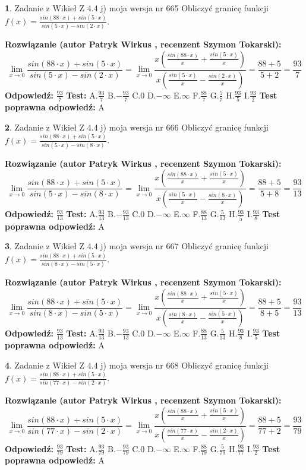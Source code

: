 \documentclass[12pt, a4paper]{article}
\theoremstyle{definition} %
\newtheorem{zad}{}
\newcommand{\zadStart}[1]{\begin{zad}#1\newline}
\newcommand{\zadStop}{\end{zad}}
\newcommand{\rozwStart}[2]{\noindent \textbf{Rozwiązanie (autor #1 , recenzent #2): }\newline}
\newcommand{\rozwStop}{\newline}
\newcommand{\odpStart}{\noindent \textbf{Odpowiedź:}\newline}
\newcommand{\odpStop}{\newline}
\newcommand{\testStart}{\noindent \textbf{Test:}\newline}
\newcommand{\testStop}{\newline}
\newcommand{\kluczStart}{\noindent \textbf{Test poprawna odpowiedź:}\newline}
\newcommand{\kluczStop}{\newline}
\begin{document}
\zadStart{Zadanie z Wikieł Z 4.4 j) moja wersja nr 665}
Obliczyć granicę funkcji $f(x)=\frac{sin(88\cdot x) +sin(5\cdot x)}{sin(5\cdot x) -sin(2\cdot x)}$.
\zadStop
\rozwStart{Patryk Wirkus}{Szymon Tokarski}
$$\lim\limits_{x\to 0}\frac{sin(88\cdot x) +sin(5\cdot x)}{sin(5\cdot x) -sin(2\cdot x)}=\lim\limits_{x\to 0}\frac{x(\frac{sin(88\cdot x)}{x}+\frac{sin(5\cdot x)}{x})}{x(\frac{sin(5\cdot x)}{x}-\frac{sin(2\cdot x)}{x})}=\frac{88+5}{5+2} = \frac{93}{7}$$
\rozwStop
\odpStart
$\frac{93}{7}$
\odpStop
\testStart
A.$\frac{93}{7}$
B.$-\frac{93}{7}$
C.$0$
D.$-\infty$
E.$\infty$
F.$\frac{88}{7}$
G.$\frac{5}{7}$
H.$\frac{93}{5}$
I.$\frac{93}{2}$
\testStop
\kluczStart
A
\kluczStop



\zadStart{Zadanie z Wikieł Z 4.4 j) moja wersja nr 666}
Obliczyć granicę funkcji $f(x)=\frac{sin(88\cdot x) +sin(5\cdot x)}{sin(5\cdot x) -sin(8\cdot x)}$.
\zadStop
\rozwStart{Patryk Wirkus}{Szymon Tokarski}
$$\lim\limits_{x\to 0}\frac{sin(88\cdot x) +sin(5\cdot x)}{sin(5\cdot x) -sin(8\cdot x)}=\lim\limits_{x\to 0}\frac{x(\frac{sin(88\cdot x)}{x}+\frac{sin(5\cdot x)}{x})}{x(\frac{sin(5\cdot x)}{x}-\frac{sin(8\cdot x)}{x})}=\frac{88+5}{5+8} = \frac{93}{13}$$
\rozwStop
\odpStart
$\frac{93}{13}$
\odpStop
\testStart
A.$\frac{93}{13}$
B.$-\frac{93}{13}$
C.$0$
D.$-\infty$
E.$\infty$
F.$\frac{88}{13}$
G.$\frac{5}{13}$
H.$\frac{93}{5}$
I.$\frac{93}{8}$
\testStop
\kluczStart
A
\kluczStop



\zadStart{Zadanie z Wikieł Z 4.4 j) moja wersja nr 667}
Obliczyć granicę funkcji $f(x)=\frac{sin(88\cdot x) +sin(5\cdot x)}{sin(8\cdot x) -sin(5\cdot x)}$.
\zadStop
\rozwStart{Patryk Wirkus}{Szymon Tokarski}
$$\lim\limits_{x\to 0}\frac{sin(88\cdot x) +sin(5\cdot x)}{sin(8\cdot x) -sin(5\cdot x)}=\lim\limits_{x\to 0}\frac{x(\frac{sin(88\cdot x)}{x}+\frac{sin(5\cdot x)}{x})}{x(\frac{sin(8\cdot x)}{x}-\frac{sin(5\cdot x)}{x})}=\frac{88+5}{8+5} = \frac{93}{13}$$
\rozwStop
\odpStart
$\frac{93}{13}$
\odpStop
\testStart
A.$\frac{93}{13}$
B.$-\frac{93}{13}$
C.$0$
D.$-\infty$
E.$\infty$
F.$\frac{88}{13}$
G.$\frac{5}{13}$
H.$\frac{93}{8}$
I.$\frac{93}{5}$
\testStop
\kluczStart
A
\kluczStop



\zadStart{Zadanie z Wikieł Z 4.4 j) moja wersja nr 668}
Obliczyć granicę funkcji $f(x)=\frac{sin(88\cdot x) +sin(5\cdot x)}{sin(77\cdot x) -sin(2\cdot x)}$.
\zadStop
\rozwStart{Patryk Wirkus}{Szymon Tokarski}
$$\lim\limits_{x\to 0}\frac{sin(88\cdot x) +sin(5\cdot x)}{sin(77\cdot x) -sin(2\cdot x)}=\lim\limits_{x\to 0}\frac{x(\frac{sin(88\cdot x)}{x}+\frac{sin(5\cdot x)}{x})}{x(\frac{sin(77\cdot x)}{x}-\frac{sin(2\cdot x)}{x})}=\frac{88+5}{77+2} = \frac{93}{79}$$
\rozwStop
\odpStart
$\frac{93}{79}$
\odpStop
\testStart
A.$\frac{93}{79}$
B.$-\frac{93}{79}$
C.$0$
D.$-\infty$
E.$\infty$
F.$\frac{88}{79}$
G.$\frac{5}{79}$
H.$\frac{93}{77}$
I.$\frac{93}{2}$
\testStop
\kluczStart
A
\kluczStop
\end{document}
